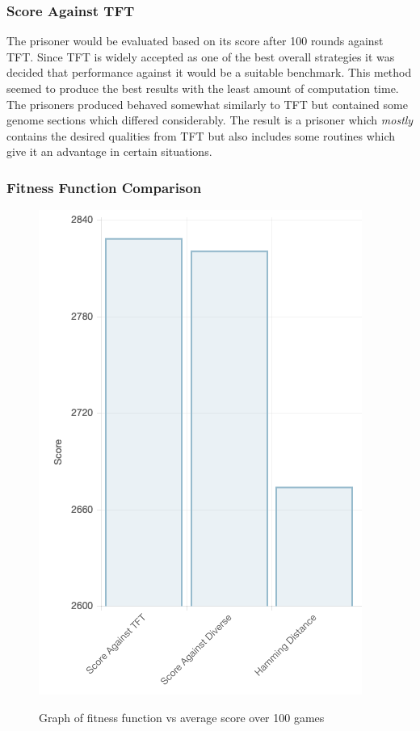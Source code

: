 \documentclass[12pt]{article}
\begin{document}
\subsubsection{Score Against TFT}
\label{tft}

The prisoner would be evaluated based on its score after 100 rounds against
TFT.  Since TFT is widely accepted as one of the best overall strategies it was
decided that performance against it would be a suitable benchmark.
This method seemed to produce the best results with the least
amount of computation time.  The prisoners produced behaved somewhat similarly
to TFT but contained some genome sections which differed considerably.  The result
is a prisoner which \textit{mostly} contains the desired qualities from TFT
but also includes some routines which give it an advantage in certain situations.


\subsubsection{Fitness Function Comparison}

\begin{figure}[h]
    \label{fig2}
    \caption{Graph of fitness function vs average score over 100 games}
    \centering
    \includegraphics[scale=0.5]{figures/fit_score.png}
    \label{fig1}
\end{figure}
\end{document}
